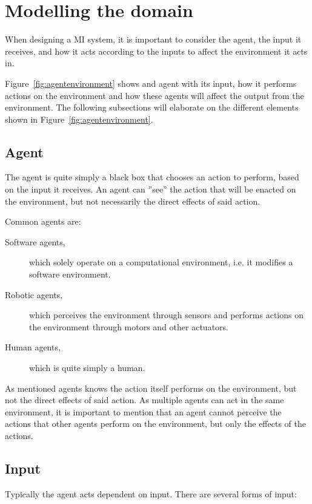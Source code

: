 \section{Modelling the domain}\label{Theory:MIModelling}
When designing a MI system, it is important to consider the agent, the input it receives, and how it acts according to the inputs to affect the environment it acts in.


Figure~\ref{fig:agentenvironment} shows and agent with its input, how it performs actions on the environment and how these agents will affect the output from the environment.
The following subsections will elaborate on the different elements shown in Figure~\ref{fig:agentenvironment}.
\subsection{Agent}
The agent is quite simply a black box that chooses an action to perform, based on the input it receives.
An agent can ''see'' the action that will be enacted on the environment, but not necessarily the direct effects of said action.

Common agents are: 
\begin{description}
    \item[Software agents,]which solely operate on a computational environment, i{.}e{.} it modifies a software environment.
    \item[Robotic agents,]which perceives the environment through sensors and performs actions on the environment through motors and other actuators.
    \item[Human agents,]which is quite simply a human. 
\end{description}
As mentioned agents knows the action itself performs on the environment, but not the direct effects of said action.
As multiple agents can act in the same environment, it is important to mention that an agent cannot perceive the actions that other agents perform on the environment, but only the effects of the actions.

\subsection{Input}
Typically the agent acts dependent on input.
There are several forms of input:

